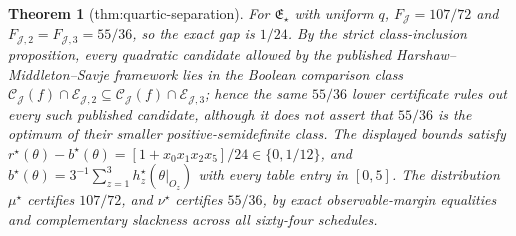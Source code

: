 \documentclass{article}
\newtheorem{theorem}{Theorem}
\begin{document}
\begin{theorem}[thm:quartic-separation]\label{thm:quartic-separation}
For \(\mathfrak E_\star\) with uniform \(q\), \(F_{\mathcal J}=107/72\) and \(F_{\mathcal J,2}=F_{\mathcal J,3}=55/36\), so the exact gap is \(1/24\). By the strict class-inclusion proposition, every quadratic candidate allowed by the published Harshaw--Middleton--Savje framework lies in the Boolean comparison class \(\mathcal C_{\mathcal J}(f)\cap\mathcal E_{\mathcal J,2}\subseteq\mathcal C_{\mathcal J}(f)\cap\mathcal E_{\mathcal J,3}\); hence the same \(55/36\) lower certificate rules out every such published candidate, although it does not assert that \(55/36\) is the optimum of their smaller positive-semidefinite class. The displayed bounds satisfy \(r^\star(\theta)-b^\star(\theta)=[1+x_0x_1x_2x_5]/24\in\{0,1/12\}\), and \(b^\star(\theta)=3^{-1}\sum_{z=1}^3h_z^\star(\theta|_{O_z})\) with every table entry in \([0,5]\). The distribution \(\mu^\star\) certifies \(107/72\), and \(\nu^\star\) certifies \(55/36\), by exact observable-margin equalities and complementary slackness across all sixty-four schedules.
\end{theorem}
\end{document}
